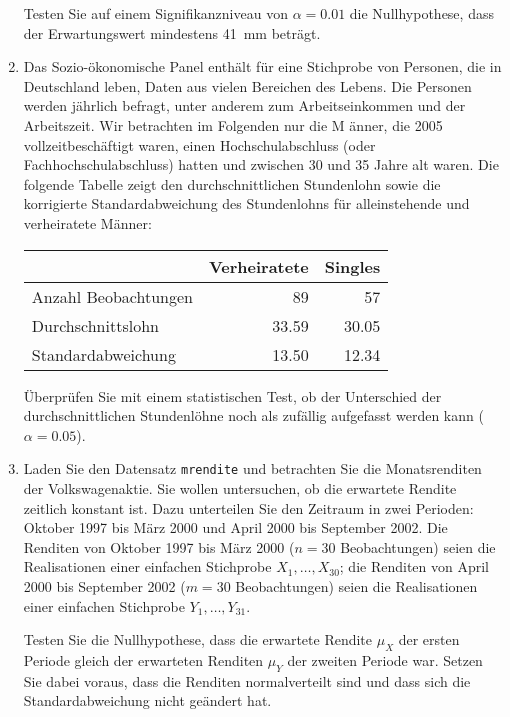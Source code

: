 \begin{enumerate}
Testen Sie auf einem Signifikanzniveau von $\alpha =0.01$ die Nullhypothese,
dass der Erwartungswert mindestens 41~mm betr\"{a}gt.

\item Das Sozio-\"{o}konomische Panel enth\"{a}lt f\"{u}r eine Stichprobe
von Personen, die in Deutschland leben, Daten aus vielen Bereichen des
Lebens. Die Personen werden j\"{a}hrlich befragt, unter anderem zum
Arbeitseinkommen und der Arbeitszeit. Wir betrachten im Folgenden nur die M%
\"{a}nner, die 2005 vollzeitbesch\"{a}ftigt waren, einen Hochschulabschluss
(oder Fachhochschulabschluss) hatten und zwischen 30 und 35 Jahre alt waren.
Die folgende Tabelle zeigt den durchschnittlichen Stundenlohn sowie die
korrigierte Standardabweichung des Stundenlohns f\"{u}r alleinstehende und
verheiratete M\"{a}nner:

\begin{center}%
\begin{tabular}{|l|r|r|}
\hline
& Verheiratete & Singles \\ \hline
Anzahl Beobachtungen & 89 & 57 \\ 
Durchschnittslohn & 33.59 & 30.05 \\ 
Standardabweichung & 13.50 & 12.34 \\ \hline
\end{tabular}
\end{center}%

\"{U}berpr\"{u}fen Sie mit einem statistischen Test, ob der Unterschied der
durchschnittlichen Stundenl\"{o}hne noch als zuf\"{a}llig aufgefasst werden
kann ($\alpha =0.05$).

\item Laden Sie den Datensatz \texttt{mrendite} und betrachten Sie die
Monatsrenditen der Volkswagenaktie. Sie wollen untersuchen, ob die erwartete
Rendite zeitlich konstant ist. Dazu unterteilen Sie den Zeitraum in zwei
Perioden: Oktober 1997 bis M\"{a}rz 2000 und April 2000 bis September 2002.
Die Renditen von Oktober 1997 bis M\"{a}rz 2000 ($n=30$ Beobachtungen) seien
die Realisationen einer einfachen Stichprobe $X_{1},\dots ,X_{30}$; die
Renditen von April 2000 bis September 2002 ($m=30$ Beobachtungen) seien die
Realisationen einer einfachen Stichprobe $Y_{1},\ldots ,Y_{31}$.

Testen Sie die Nullhypothese, dass die erwartete Rendite $\mu _{X}$ der
ersten Periode gleich der erwarteten Renditen $\mu _{Y}$ der zweiten Periode
war. Setzen Sie dabei voraus, dass die Renditen normalverteilt sind und dass
sich die Standardabweichung nicht ge\"{a}ndert hat.


\end{enumerate}
